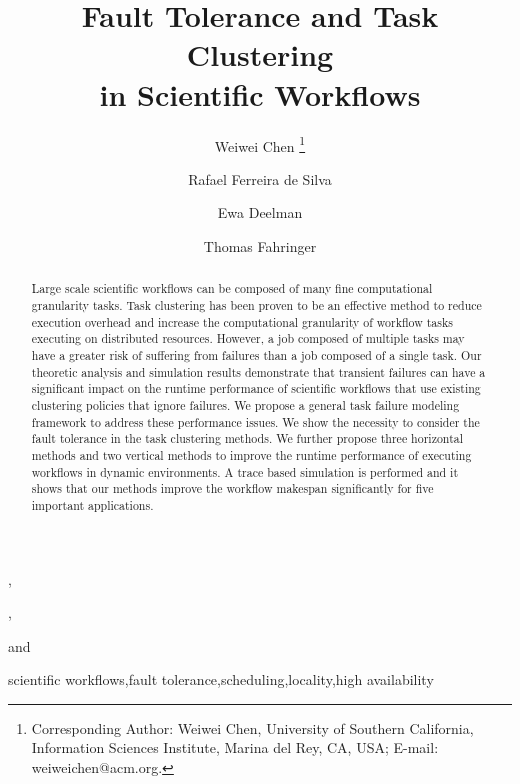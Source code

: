 \documentclass{IOS-Book-Article}
\begin{document}
\begin{frontmatter}              %

\title{Fault Tolerance and Task Clustering\\
 in Scientific Workflows}

\author[A]{{Weiwei} {Chen}%
\thanks{Corresponding Author: Weiwei Chen, University of Southern California, Information Sciences Institute, Marina del Rey, CA, USA; E-mail:
weiweichen@acm.org.}},
\author[A]{Rafael Ferreira de Silva}, 
\author[A]{{Ewa Deelman}}
and 
\author[B]{{Thomas} {Fahringer}}

\address[A]{University of Southern California, Information Sciences Institute, Marina del Rey, CA, USA}
\address[B]{University of Innsbruck, Institute for Computer Science, Innsbruck, Austria}

\begin{abstract}
Large scale scientific workflows can be composed of many fine computational granularity tasks. Task clustering has been proven to be an effective method to reduce execution overhead and increase the computational granularity of workflow tasks executing on distributed resources. However, a job composed of multiple tasks may have a greater risk of suffering from failures than a job composed of a single task. Our theoretic analysis and simulation results demonstrate that transient failures can have a significant impact on the runtime performance of scientific workflows that use existing clustering policies that ignore failures. We propose a general task failure modeling framework to address these performance issues. We show the necessity to consider the fault tolerance in the task clustering methods.  We further propose three horizontal methods and two vertical methods to improve the runtime performance of executing workflows in dynamic environments. A trace based simulation is performed and it shows that our methods improve the workflow makespan significantly for five important applications.    
\end{abstract}

\begin{keyword}
scientific workflows\sep fault tolerance\sep scheduling\sep locality\sep high availability 
\end{keyword}
\end{frontmatter}

\thispagestyle{empty}
\pagestyle{empty}
\end{document}
